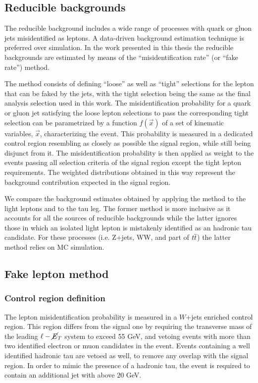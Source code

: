 \subsection{Reducible backgrounds}

The reducible background includes a wide range of processes with quark or gluon jets misidentified as leptons. %
A data-driven background estimation technique is preferred over simulation. %
In the work presented in this thesis the reducible backgrounds are estimated by means of the ``misidentification rate'' (or ``fake rate'') method.

The method consists of defining ``loose'' as well as ``tight'' selections for the lepton that can be faked by the jets, with the tight selection being the same as the final analysis selection used in this work.
The misidentification probability for a quark or gluon jet satisfying the loose lepton selections to pass the corresponding tight selection can be parametrized by a function $f(\vec{x})$ of a set of kinematic variables, $\vec{x}$, characterizing the event. This probability is measured in a dedicated control region resembling as closely as possible the signal region, while still being disjunct from it. The misidentification probability is then applied as weight to the events passing all selection criteria of the signal region except the tight lepton requirements. The weighted distributions obtained in this way represent the background contribution expected in the signal region.

We compare the background estimates obtained by applying the method to the light leptons and to the tau leg. 
The former method is more inclusive as it accounts for all the sources of reducible backgrounds while the latter ignores those in which an isolated light lepton is mistakenly identified as an hadronic tau candidate. For these processes (i.e. Z+jets, WW, and part of $t\overline{t}$) the latter method relies on MC simulation. 

\subsection{Fake lepton method}
\label{sec:fakemethod}
\subsubsection{Control region definition}
The lepton misidentification probability is measured in a $W$+jets enriched control region.
This region differs from the signal one by requiring the transverse mass of the leading $\ell-\cancel{E}_T$ system to exceed 55 GeV,
and vetoing events with more than two identified electron or muon candidates in the event. Events containing a well identified hadronic tau are vetoed as well, to remove any overlap with the signal region. In order to mimic the presence of a hadronic tau, the event is required to contain an additional jet with \pT above $20$ GeV.

